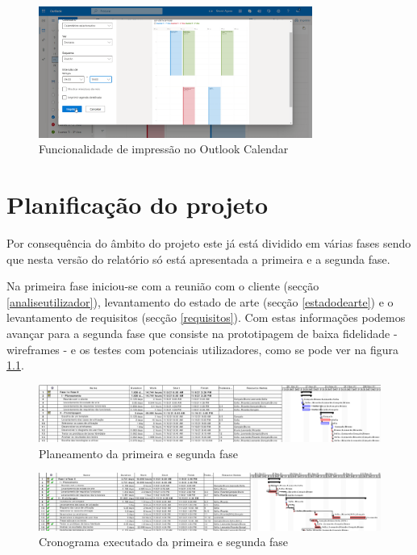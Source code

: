 \documentclass[11pt, twoside]{report}
\begin{document}
	\begin{figure}[H] 
		\centering
		\includegraphics[width=0.8\textwidth,height=0.8\textheight,keepaspectratio]{image/estadodearte/imprimir_outlook}
		\caption{Funcionalidade de impressão no Outlook Calendar}
		\label{outlookexportar}
	\end{figure}
	
	\chapter{Planificação do projeto}
	
	Por consequência do âmbito do projeto este já está dividido em várias fases sendo que nesta versão do relatório só está apresentada a primeira e a segunda fase.
	
	Na primeira fase iniciou-se com a reunião com o cliente (secção \ref{analiseutilizador}), levantamento do estado de arte (secção \ref{estadodearte}) e o levantamento de requisitos (secção \ref{requisitos}). Com estas informações podemos avançar para a segunda fase que consiste na prototipagem de baixa fidelidade - wireframes - e os testes com potenciais utilizadores, como se pode ver na figura \ref{cronogramaexecutado}.
	
	\clearpage
	\begin{landscape}
		\pagestyle{empty}
		
		\begin{figure}[H] 
			\centering 			\includegraphics[width=1.4\textwidth,height=1.4\textheight,keepaspectratio]{image/planeamento_1fase}
			\caption{Planeamento da primeira e segunda fase}
			
		\end{figure}
		
		\begin{figure}[H] 
			\centering 			\includegraphics[width=1.4\textwidth,height=1.4\textheight,keepaspectratio]{image/cronogramaexecutado}
			\caption{Cronograma executado da primeira e segunda fase}
			\label{cronogramaexecutado}
		\end{figure}
	\end{landscape}
	
\end{document}
